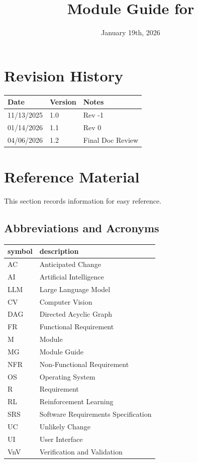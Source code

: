 \documentclass[12pt, titlepage]{article}
\begin{document}
\title{Module Guide for \progname{}}
\author{\authname}
\date{January 19th, 2026}

\maketitle


\section{Revision History}

\begin{tabularx}{\textwidth}{p{3cm}p{2cm}X}
\toprule {\bf Date} & {\bf Version} & {\bf Notes}\\
\midrule
11/13/2025 & 1.0 & Rev -1\\
01/14/2026 & 1.1 & Rev 0\\
04/06/2026 & 1.2 & Final Doc Review\\
\bottomrule
\end{tabularx}

\newpage

\section{Reference Material}

This section records information for easy reference.

\subsection{Abbreviations and Acronyms}

\renewcommand{\arraystretch}{1.2}
\begin{tabular}{l l}
  \toprule
  \textbf{symbol} & \textbf{description}\\
  \midrule
  AC & Anticipated Change\\
  AI & Artificial Intelligence \\
  LLM & Large Language Model \\
  CV & Computer Vision \\
  DAG & Directed Acyclic Graph \\
  FR & Functional Requirement \\
  M & Module \\
  MG & Module Guide \\
  NFR & Non-Functional Requirement \\
  OS & Operating System \\
  R & Requirement\\
  RL & Reinforcement Learning \\
  SRS & Software Requirements Specification\\
  UC & Unlikely Change \\
  UI & User Interface \\
  VnV & Verification and Validation \\
  \bottomrule
\end{tabular}\\
\end{document}
